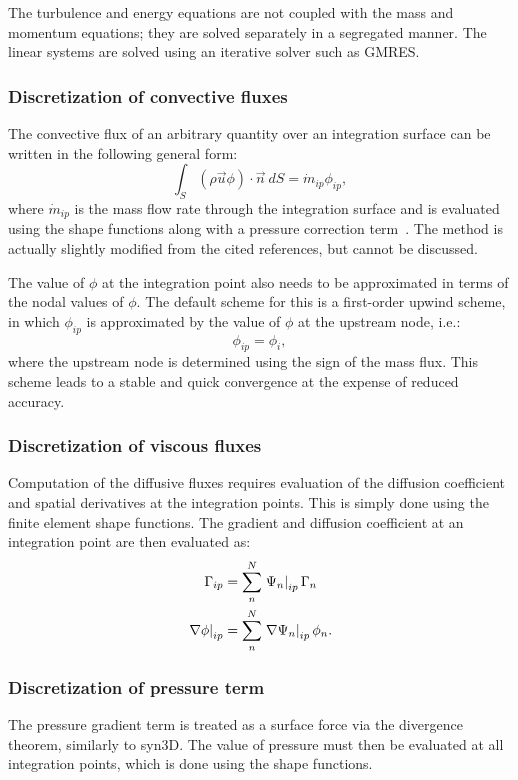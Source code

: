 The turbulence and energy equations are not coupled with the mass and momentum equations; they are solved separately in a segregated manner. The linear systems are solved using an iterative solver such as GMRES.

\subsubsection{Discretization of convective fluxes}
The convective flux of an arbitrary quantity over an integration surface can be written in the following general form:
\begin{equation*}
    \int_S (\rho\vec{u}\phi)\cdot\vec{n}~dS = \dot{m}_{ip}\phi_{ip},
\end{equation*}
where $\dot{m}_{ip}$ is the mass flow rate through the integration surface and is evaluated using the shape functions along with a pressure correction term~\cite{schneider1987control,rhie1983numerical}. The method is actually slightly modified from the cited references, but cannot be discussed.

The value of $\phi$ at the integration point also needs to be approximated in terms of the nodal values of $\phi$. The default scheme for this is a first-order upwind scheme, in which $\phi_{ip}$ is approximated by the value of $\phi$ at the upstream node, i.e.:
\begin{equation*}
    \phi_{ip} = \phi_{i},
\end{equation*}
where the upstream node is determined using the sign of the mass flux. This scheme leads to a stable and quick convergence at the expense of reduced accuracy.

\subsubsection{Discretization of viscous fluxes}
Computation of the diffusive fluxes requires evaluation of the diffusion coefficient and spatial derivatives at the integration points. This is simply done using the finite element shape functions. The gradient and diffusion coefficient at an integration point are then evaluated as:
\begin{align*}
    \Gamma_{ip} &= \sum_n^N \left.\Psi_n\right|_{ip}\Gamma_n \\
    \left.\nabla\phi\right|_{ip} &= \sum_n^N \left.\nabla\Psi_n\right|_{ip}\phi_n.
\end{align*}

\subsubsection{Discretization of pressure term}
The pressure gradient term is treated as a surface force via the divergence theorem, similarly to syn3D. The value of pressure must then be evaluated at all integration points, which is done using the shape functions.

